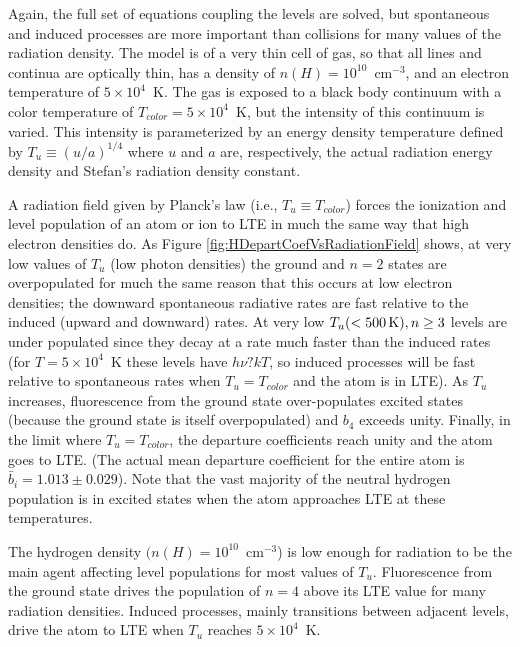 Again, the full set of equations coupling the levels are solved, but
spontaneous and induced processes are more important than collisions for
many values of the radiation density.  The model is of a very thin cell
of gas, so that all lines and continua are optically thin, has a density
of $n(H) = 10^{10}$~cm$^{-3}$, and an electron temperature of $5 \times
10^4$~K.
The gas is
exposed to a black body continuum with a color temperature of
$T_{color} = 5
\times 10^4$~K, but the intensity of this continuum is varied.  This intensity is
parameterized by an energy density temperature defined by $T_u \equiv
(u/a)^{1/4}$ where
$u$ and $a$ are, respectively, the actual radiation energy density and Stefan's
radiation density constant.

A radiation field given by Planck's law (i.e., $T_u\equiv  T_{color}$) forces the
ionization and level population of an atom or ion to LTE in much the same
way that high electron densities do.
As Figure \ref{fig:HDepartCoefVsRadiationField} shows, at very low values
of $T_u$ (low photon densities) the ground and $n = 2$ states are overpopulated
for much the same reason that this occurs at low electron densities; the
downward spontaneous radiative rates are fast relative to the induced (upward
and downward) rates.  At very low $T_u (< 500 {\rm\thinspace K}), n \ge 3$ levels are under
populated since they decay at a rate much faster than the induced rates
(for $T = 5 \times 10^4$~K these levels have $h\nu? kT$, so induced processes will be
fast relative to spontaneous rates when $T_u = T_{color}$ and the atom is in LTE).
As $T_u$ increases, fluorescence from the ground state over-populates excited
states (because the ground state is itself overpopulated) and $b_4$ exceeds
unity.  Finally, in the limit where $T_u = T_{color}$, the departure coefficients
reach unity and the atom goes to LTE.  (The actual mean departure coefficient
for the entire atom is ${\bar b_i} = 1.013 \pm 0.029$).  Note that the vast majority of the neutral hydrogen population is
in excited states when the atom approaches LTE at these temperatures.

The hydrogen density $(n(H) = 10^{10}$~cm$^{-3}$) is low enough for radiation to
be the main agent affecting level populations for most values of $T_u$.
Fluorescence from the ground state drives the population of $n=4$ above its
LTE value for many radiation densities.  Induced processes, mainly
transitions between adjacent levels, drive the atom to LTE when $T_u$ reaches
$5 \times 10^4$~K.


